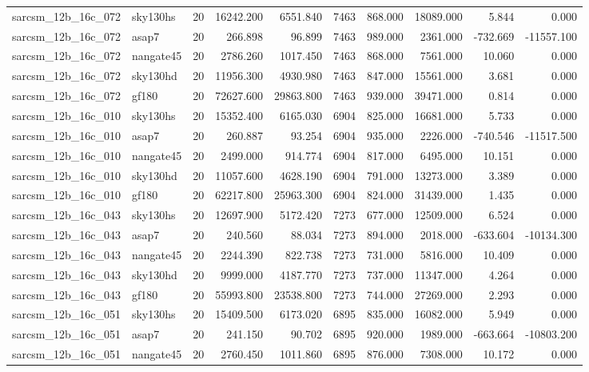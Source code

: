 \begin{tabular}{llrrrrrrrr}
sarcsm\_12b\_16c\_072 & sky130hs & 20 & 16242.200 & 6551.840 & 7463 & 868.000 & 18089.000 & 5.844 & 0.000 \\
sarcsm\_12b\_16c\_072 & asap7 & 20 & 266.898 & 96.899 & 7463 & 989.000 & 2361.000 & -732.669 & -11557.100 \\
sarcsm\_12b\_16c\_072 & nangate45 & 20 & 2786.260 & 1017.450 & 7463 & 868.000 & 7561.000 & 10.060 & 0.000 \\
sarcsm\_12b\_16c\_072 & sky130hd & 20 & 11956.300 & 4930.980 & 7463 & 847.000 & 15561.000 & 3.681 & 0.000 \\
sarcsm\_12b\_16c\_072 & gf180 & 20 & 72627.600 & 29863.800 & 7463 & 939.000 & 39471.000 & 0.814 & 0.000 \\
sarcsm\_12b\_16c\_010 & sky130hs & 20 & 15352.400 & 6165.030 & 6904 & 825.000 & 16681.000 & 5.733 & 0.000 \\
sarcsm\_12b\_16c\_010 & asap7 & 20 & 260.887 & 93.254 & 6904 & 935.000 & 2226.000 & -740.546 & -11517.500 \\
sarcsm\_12b\_16c\_010 & nangate45 & 20 & 2499.000 & 914.774 & 6904 & 817.000 & 6495.000 & 10.151 & 0.000 \\
sarcsm\_12b\_16c\_010 & sky130hd & 20 & 11057.600 & 4628.190 & 6904 & 791.000 & 13273.000 & 3.389 & 0.000 \\
sarcsm\_12b\_16c\_010 & gf180 & 20 & 62217.800 & 25963.300 & 6904 & 824.000 & 31439.000 & 1.435 & 0.000 \\
sarcsm\_12b\_16c\_043 & sky130hs & 20 & 12697.900 & 5172.420 & 7273 & 677.000 & 12509.000 & 6.524 & 0.000 \\
sarcsm\_12b\_16c\_043 & asap7 & 20 & 240.560 & 88.034 & 7273 & 894.000 & 2018.000 & -633.604 & -10134.300 \\
sarcsm\_12b\_16c\_043 & nangate45 & 20 & 2244.390 & 822.738 & 7273 & 731.000 & 5816.000 & 10.409 & 0.000 \\
sarcsm\_12b\_16c\_043 & sky130hd & 20 & 9999.000 & 4187.770 & 7273 & 737.000 & 11347.000 & 4.264 & 0.000 \\
sarcsm\_12b\_16c\_043 & gf180 & 20 & 55993.800 & 23538.800 & 7273 & 744.000 & 27269.000 & 2.293 & 0.000 \\
sarcsm\_12b\_16c\_051 & sky130hs & 20 & 15409.500 & 6173.020 & 6895 & 835.000 & 16082.000 & 5.949 & 0.000 \\
sarcsm\_12b\_16c\_051 & asap7 & 20 & 241.150 & 90.702 & 6895 & 920.000 & 1989.000 & -663.664 & -10803.200 \\
sarcsm\_12b\_16c\_051 & nangate45 & 20 & 2760.450 & 1011.860 & 6895 & 876.000 & 7308.000 & 10.172 & 0.000 \\

\end{tabular}
